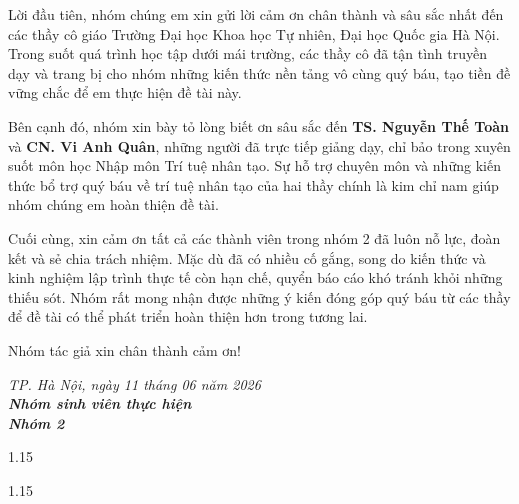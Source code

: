 \documentclass[
12pt,
oneside,
english,
doublespacing,
nolistspacing,
liststotoc,
parskip,
headsepline,
chapterinoneline,
]{HUSdissertation}
\begin{document}
	\begin{acknowledgements}
		\addchaptertocentry{\acknowledgementname}
		\thispagestyle{empty}
		
		\indent Lời đầu tiên, nhóm chúng em xin gửi lời cảm ơn chân thành và sâu sắc nhất đến các thầy cô giáo Trường Đại học Khoa học Tự nhiên, Đại học Quốc gia Hà Nội. Trong suốt quá trình học tập dưới mái trường, các thầy cô đã tận tình truyền dạy và trang bị cho nhóm những kiến thức nền tảng vô cùng quý báu, tạo tiền đề vững chắc để em thực hiện đề tài này.
		
		Bên cạnh đó, nhóm xin bày tỏ lòng biết ơn sâu sắc đến \textbf{TS. Nguyễn Thế Toàn} và \textbf{CN. Vi Anh Quân}, những người đã trực tiếp giảng dạy, chỉ bảo trong xuyên suốt môn học Nhập môn Trí tuệ nhân tạo. Sự hỗ trợ chuyên môn và những kiến thức bổ trợ quý báu về trí tuệ nhân tạo của hai thầy chính là kim chỉ nam giúp nhóm chúng em hoàn thiện đề tài. 
		
		Cuối cùng, xin cảm ơn tất cả các thành viên trong nhóm 2 đã luôn nỗ lực, đoàn kết và sẻ chia trách nhiệm. Mặc dù đã có nhiều cố gắng, song do kiến thức và kinh nghiệm lập trình thực tế còn hạn chế, quyển báo cáo khó tránh khỏi những thiếu sót. Nhóm rất mong nhận được những ý kiến đóng góp quý báu từ các thầy để đề tài có thể phát triển hoàn thiện hơn trong tương lai. 
		
		Nhóm tác giả xin chân thành cảm ơn!
		\begin{flushright}
			\itshape TP. Hà Nội, ngày 11 tháng 06 năm 2026 \\[0.2cm]
			\normalfont\bfseries Nhóm sinh viên thực hiện \\[0.2cm]
			\normalfont Nhóm 2
		\end{flushright}
		 
	\end{acknowledgements}
	
	
	
	\begin{spacing}{1.15}
		\tableofcontents 	%
	\end{spacing}
	
	\begin{spacing}{1.15}
		\listoffigures 		%
	\end{spacing}
	
\end{document}
